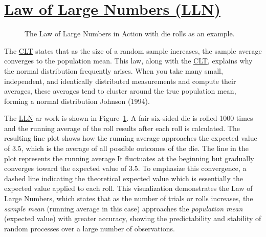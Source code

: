 \documentclass[
  a4paper,
]{scrbook}
\begin{document}
\section{\texorpdfstring{\hyperref[acronyms_LLN]{Law of Large Numbers
(LLN)}}{Law of Large Numbers (LLN)}}\label{section-1}

\begin{figure}[H]


\caption{\label{fig-lln}The Law of Large Numbers in Action with die
rolls as an example.}

\end{figure}%

The \hyperref[acronyms_CLT]{CLT} states that as the size of a random
sample increases, the sample average converges to the population mean.
This law, along with the \hyperref[acronyms_CLT]{CLT}, explains why the
normal distribution frequently arises. When you take many small,
independent, and identically distributed measurements and compute their
averages, these averages tend to cluster around the true population
mean, forming a normal distribution Johnson (1994).

The \hyperref[lln]{LLN} ar work is shown in Figure~\ref{fig-lln}. A fair
six-sided die is rolled 1000 times and the running average of the roll
results after each roll is calculated. The resulting line plot shows how
the running average approaches the expected value of \(3.5\), which is
the average of all possible outcomes of the die. The line in the plot
represents the running average It fluctuates at the beginning but
gradually converges toward the expected value of \(3.5\). To emphasize
this convergence, a dashed line indicating the theoretical expected
value which is essentially the expected value applied to each roll. This
visualization demonstrates the Law of Large Numbers, which states that
as the number of trials or rolls increases, the \emph{sample mean}
(running average in this case) approaches the \emph{population mean}
(expected value) with greater accuracy, showing the predictability and
stability of random processes over a large number of observations.
\end{document}
